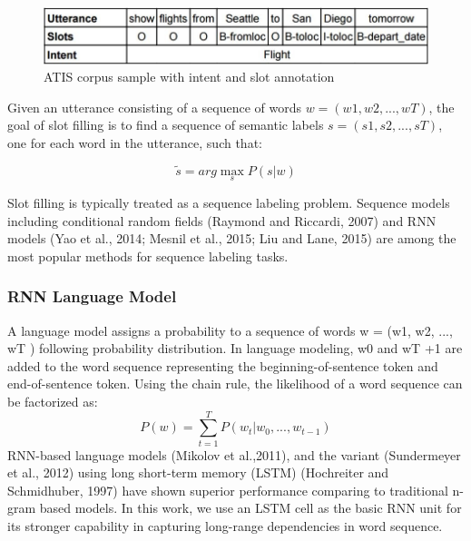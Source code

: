 \begin{figure}
	\centering
	\includegraphics[width=\textwidth]{fig/atis}
	\caption{ATIS corpus sample with intent and slot annotation}
\end{figure}

Given an utterance consisting of a sequence of words $w = (w1, w2, ..., wT)$, the goal of slot filling is to find a sequence of semantic labels $s = (s1, s2, ..., sT)$, one for each word in the utterance, such that:

\begin{equation}
\tilde{s} = arg\max_{s} P(s|w)
\end{equation}

Slot filling is typically treated as a sequence labeling problem. Sequence models including conditional random fields (Raymond and Riccardi, 2007) and RNN models (Yao et al., 2014; Mesnil et al., 2015; Liu and Lane, 2015) are among the most popular methods for sequence labeling tasks.

\subsubsection{RNN Language Model}
A language model assigns a probability to a sequence of words w = (w1, w2, ..., wT ) following
probability distribution. In language modeling, w0 and wT +1 are added to the word sequence representing the beginning-of-sentence token and end-of-sentence token. Using the chain rule, the likelihood of a word sequence can be factorized as:
\begin{equation}
P(w) = \sum_{t=1}^{T} P(w_t|w_0 , ..., w_{t-1})
\end{equation}
RNN-based language models (Mikolov et al.,2011), and the variant (Sundermeyer et al., 2012) using long short-term memory (LSTM) (Hochreiter and Schmidhuber, 1997) have shown superior
performance comparing to traditional n-gram based models. In this work, we use an LSTM cell
as the basic RNN unit for its stronger capability in capturing long-range dependencies in word sequence. 

